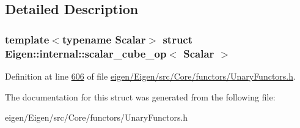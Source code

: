 \subsection{Detailed Description}
\subsubsection*{template$<$typename Scalar$>$\newline
struct Eigen\+::internal\+::scalar\+\_\+cube\+\_\+op$<$ Scalar $>$}



Definition at line \hyperlink{eigen_2_eigen_2src_2_core_2functors_2_unary_functors_8h_source_l00606}{606} of file \hyperlink{eigen_2_eigen_2src_2_core_2functors_2_unary_functors_8h_source}{eigen/\+Eigen/src/\+Core/functors/\+Unary\+Functors.\+h}.



The documentation for this struct was generated from the following file\+:\begin{DoxyCompactItemize}
\item 
eigen/\+Eigen/src/\+Core/functors/\+Unary\+Functors.\+h\end{DoxyCompactItemize}
